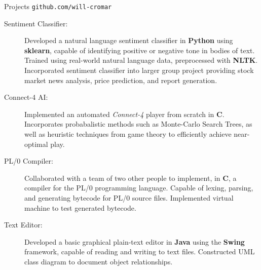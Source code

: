 \documentclass[letterpaper,11pt,oneside]{article}
\newcommand{\resheader}[2][]{
  \vspace{9pt}
  {\LARGE #2} #1
  \\
}
\newcommand{\ressubheader}[3][]{
  \vspace{6pt}
  {\large \textbf{#2} #1} \hfill \emph{#3}
  \\
}
\newcommand{\resskill}[1]{\textbf{#1}}
\begin{document}
\resheader[\hfill \texttt{github.com/will-cromar}]{Projects}
\begin{description}
  \item [Sentiment Classifier:] Developed a natural language
    sentiment classifier in \resskill{Python} using \resskill{sklearn}, capable
    of identifying positive or negative tone in bodies of text. Trained using
    real-world natural language data, preprocessed with \resskill{NLTK}.
    Incorporated sentiment classifier into larger group project providing stock
    market news analysis, price prediction, and report generation.
  \item [Connect-4 AI:] Implemented an automated \emph{Connect-4} player from
    scratch in \resskill{C}. Incorporates probabalistic methods such as
    Monte-Carlo Search Trees, as well as heuristic techniques from game theory
    to efficiently achieve near-optimal play.
  \item [PL/0 Compiler:] Collaborated with a team of two other people to
    implement, in \resskill{C}, a compiler for the PL/0 programming language.
    Capable of lexing, parsing, and generating bytecode for PL/0 source files.
    Implemented virtual machine to test generated bytecode.
  \item [Text Editor:] Developed a basic graphical plain-text editor in
    \resskill{Java} using the \resskill{Swing} framework, capable of reading and
    writing to text files. Constructed UML class diagram to document object
    relationships.
\end{description}    


\end{document}
